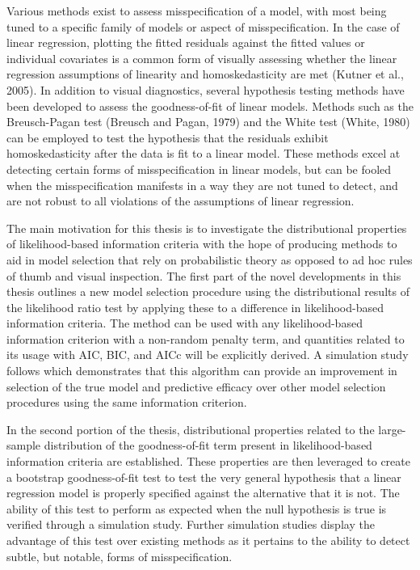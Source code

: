		Various methods exist to assess misspecification of a model, with most being tuned to a specific family of models or aspect of misspecification. In the case of linear regression,
		plotting the fitted residuals against the fitted values or individual covariates is a common form of visually assessing whether the linear regression assumptions of linearity and
		homoskedasticity are met (Kutner et al., 2005). In addition to visual diagnostics, several hypothesis testing methods have been developed to assess the goodness-of-fit of linear
		models. Methods such as the Breusch-Pagan test (Breusch and Pagan, 1979) and the White test (White, 1980) can be employed to test the hypothesis that the residuals exhibit homoskedasticity
		after the data is fit to a linear model. These methods excel at detecting certain forms of misspecification in linear models, but can be fooled when the misspecification manifests in a
		way they are not tuned to detect, and are not robust to all violations of the assumptions of linear regression.

		The main motivation for this thesis is to investigate the distributional properties of likelihood-based information criteria with the hope of producing methods to aid in model selection
		that rely on probabilistic theory as opposed to ad hoc rules of thumb and visual inspection. The first part of the novel developments in this thesis outlines a new model selection procedure using the distributional
		results of the likelihood ratio test by applying these to a difference in likelihood-based information criteria. The method can be used with any likelihood-based information criterion
		with a non-random penalty term, and quantities related to its usage with AIC, BIC, and AICc will be explicitly derived. A simulation study follows which demonstrates that this algorithm
		can provide an improvement in selection of the true model and predictive efficacy over other model selection procedures using the same information criterion.
		
		In the second portion of the thesis, distributional properties related to the large-sample distribution of the goodness-of-fit term present in likelihood-based information criteria
		are established. These properties are then leveraged to create a bootstrap goodness-of-fit test to test the very general hypothesis that a linear regression model is properly specified
		against the alternative that it is not. The ability of this test to perform as expected when the null hypothesis is true is verified through a simulation study. Further simulation
		studies display the advantage of this test over existing methods as it pertains to the ability to detect subtle, but notable, forms of misspecification.

